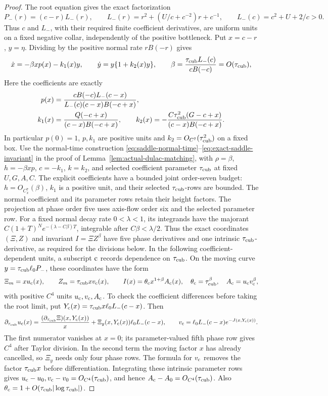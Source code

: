 \begin{proof}
The root equation gives the exact factorization
\[
 P_-(r)=(c-r)L_-(r),\qquad
 L_-(r)=r^2+(U/c+c^{-2})r+c^{-1},\qquad
 L_-(c)=c^2+U+2/c>0.
\]
Thus \(c\) and \(L_-\), with their required finite coefficient
derivatives, are uniform units on a fixed negative collar,
independently of the positive bottleneck. Put \(x=c-r\), \(y=\eta\).
Dividing by the
positive normal rate \(rB(-r)\) gives
\[
 \dot x=-\beta x p(x)-k_1(x)y,\qquad
 \dot y=y\{1+k_2(x)y\},\qquad
 \beta=\frac{\tau_{\rm cub} L_-(c)}{cB(-c)}=O(\tau_{\rm cub}),
\]
Here the coefficients are exactly
\[
 \begin{split}
 p(x)&=\frac{cB(-c)L_-(c-x)}{L_-(c)(c-x)B(-c+x)},\\
 k_1(x)&=\frac{Q(-c+x)}{(c-x)B(-c+x)},\qquad
 k_2(x)=-\frac{C\tau_{\rm cub}^2(G-c+x)}{(c-x)B(-c+x)}.
 \end{split}
\]
In particular \(p(0)=1\), \(p,k_1\) are positive units and
\(k_2=O_{C^7}(\tau_{\rm cub}^2)\) on a fixed box.
Use the normal-time construction
\eqref{eq:saddle-normal-time}--\eqref{eq:exact-saddle-invariant} in the
proof of Lemma~\ref{lem:actual-dulac-matching}, with
\(\rho=\beta\), \(h=-\beta xp\), \(c=-k_1\), \(k=k_2\),
and selected coefficient parameter \(\tau_{\rm cub}\) at fixed \(U,G,A,C\).
The explicit coefficients have a bounded joint order-seven budget:
\(h=O_{C_x^7}(\beta)\), \(k_1\) is a positive unit, and their
selected \(\tau_{\rm cub}\)-rows are bounded. The normal coefficient and its
parameter rows retain their height factors.
The projection at phase order five uses axis-flow order six and the
selected parameter row. For a fixed normal decay rate \(0<\lambda<1\),
its integrands have the majorant
\(C(1+T)^Ne^{-(\lambda-C\beta)T}\), integrable after
\(C\beta<\lambda/2\). Thus the exact coordinates \((\Xi,Z)\)
and invariant \(I=\Xi Z^\beta\) have five phase derivatives and one
intrinsic \(\tau_{\rm cub}\)-derivative, as required for the divisions below.
In the following coefficient-dependent units, a subscript
\({\rm c}\) records dependence on \(\tau_{\rm cub}\). On the moving curve
\(y=\tau_{\rm cub}\ell_0P_-\), these coordinates have the form
\[
 \Xi_m=xu_{\rm c}(x),\qquad Z_m=\tau_{\rm cub} xv_{\rm c}(x),\qquad
 I(x)=\theta_{\rm c} x^{1+\beta}A_{\rm c}(x),\quad
 \theta_{\rm c}=\tau_{\rm cub}^\beta,\quad A_{\rm c}=u_{\rm c} v_{\rm c}^\beta,
\]
with positive \(C^4\) units \(u_{\rm c},v_{\rm c},A_{\rm c}\).
To check the coefficient differences before taking the root limit, put
\(Y_{\rm c}(x)=\tau_{\rm cub} x\ell_0L_-(c-x)\). Then
\[
 \partial_{\tau_{\rm cub}}u_{\rm c}(x)=
 \frac{(\partial_{\tau_{\rm cub}}\Xi)(x,Y_{\rm c}(x))}{x}
 +\Xi_y(x,Y_{\rm c}(x))\ell_0L_-(c-x),\qquad
 v_{\rm c}=\ell_0L_-(c-x)e^{-J(x,Y_{\rm c}(x))}.
\]
The first numerator vanishes at \(x=0\); its parameter-valued fifth
phase row gives \(C^4\) after Taylor division. In the second term the
moving factor \(x\) has already cancelled, so \(\Xi_y\) needs only
four phase rows. The formula for \(v_{\rm c}\) removes the factor
\(\tau_{\rm cub} x\) before differentiation. Integrating these intrinsic
parameter rows gives \(u_{\rm c}-u_0,v_{\rm c}-v_0=O_{C^4}(\tau_{\rm cub})\),
and hence \(A_{\rm c}-A_0=O_{C^4}(\tau_{\rm cub})\). Also
\(\theta_{\rm c}=1+O(\tau_{\rm cub}|\log\tau_{\rm cub}|)\).


\end{proof}
